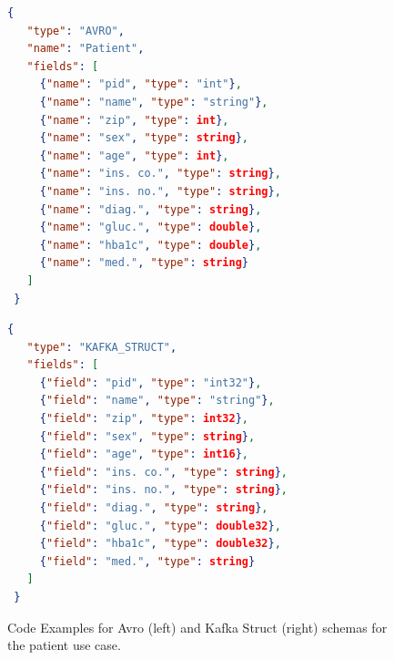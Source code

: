 \begin{figure}[ht]
   \centering
   \begin{minipage}{.45\textwidth}
     \begin{lstlisting}[language=json, basicstyle=\ttfamily\notsotiny, frame=tb]
 {
   "type": "AVRO",
   "name": "Patient",
   "fields": [
     {"name": "pid", "type": "int"},
     {"name": "name", "type": "string"},
     {"name": "zip", "type": int},
     {"name": "sex", "type": string},
     {"name": "age", "type": int},
     {"name": "ins. co.", "type": string},
     {"name": "ins. no.", "type": string},
     {"name": "diag.", "type": string},
     {"name": "gluc.", "type": double},
     {"name": "hba1c", "type": double},
     {"name": "med.", "type": string}
   ]
 }
     \end{lstlisting}
   \end{minipage}\hfill
   \begin{minipage}{.45\textwidth}
     \begin{lstlisting}[language=json, basicstyle=\ttfamily\notsotiny, frame=tb]
 {
   "type": "KAFKA_STRUCT",
   "fields": [
     {"field": "pid", "type": "int32"},
     {"field": "name", "type": "string"},
     {"field": "zip", "type": int32},
     {"field": "sex", "type": string},
     {"field": "age", "type": int16},
     {"field": "ins. co.", "type": string},
     {"field": "ins. no.", "type": string},
     {"field": "diag.", "type": string},
     {"field": "gluc.", "type": double32},
     {"field": "hba1c", "type": double32},
     {"field": "med.", "type": string}
   ]
 }
     \end{lstlisting}
   \end{minipage}
   \caption{Code Examples for Avro (left) and Kafka Struct (right) schemas for the patient use case.\label{fig:avro_kafkastruct_schemas}}
 \end{figure}

